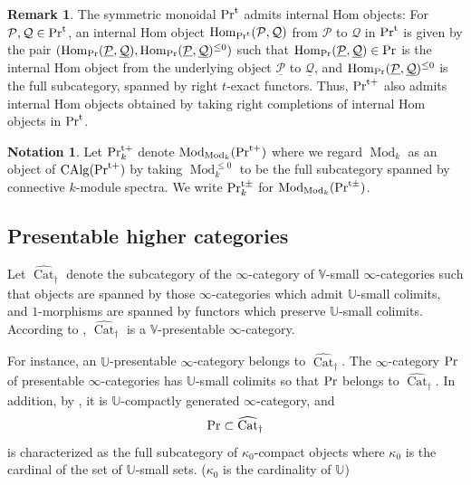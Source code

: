 \documentclass[leqno,12pt]{amsart}
\theoremstyle{plain}
\theoremstyle{definition}
\newtheorem{Remark}[Theorem]{Remark}
\newtheorem{Notation}[Theorem]{Notation}
\newcommand{\PR}{\textup{Pr}}
\newcommand{\PRT}{\textup{Pr}^{\textup{t}}}
\newcommand{\PRTT}{\textup{Pr}^{\textup{t}+}}
\newcommand{\PRTTT}{\textup{Pr}^{\textup{t}\pm}}
\newcommand{\Hom}{\operatorname{Hom}}
\newcommand{\Mod}{\operatorname{Mod}}
\newcommand{\CAlg}{\operatorname{CAlg}}
\newcommand{\vCat}{\widehat{\operatorname{Cat}}_\dagger}
\newcommand{\UUUU}{\mathbb{U}}
\newcommand{\VVVV}{\mathbb{V}}
\begin{document}
\begin{Remark}
\label{inthomtstr}
The symmetric monoidal $\PRT$ admits internal Hom objects: For $\mathcal{P}, \mathcal{Q}\in \PRT$, an internal Hom object $\Hom_{\PRT}(\mathcal{P},\mathcal{Q})$ from $\mathcal{P}$ to $\mathcal{Q}$ in $\PRT$ is 
given  by the pair $(\Hom_{\PR}(\underline{\mathcal{P}},\underline{\mathcal{Q}}), \Hom_{\PR}(\underline{\mathcal{P}},\underline{\mathcal{Q}})^{\le0})$
such that $\Hom_{\PR}(\underline{\mathcal{P}},\underline{\mathcal{Q}})\in \PR$ 
is the internal Hom object from the underlying object $\underline{\mathcal{P}}$ to $\underline{\mathcal{Q}}$, and 
 $\Hom_{\PR}(\underline{\mathcal{P}},\underline{\mathcal{Q}})^{\le0}$ is the full subcategory, spanned by right $t$-exact functors.
Thus, $\PRTT$ also admits internal Hom objects obtained by taking right completions of internal Hom objects in $\PRT$.
\end{Remark}





\begin{Notation}
Let $\PRTT_k$ denote $\Mod_{\Mod_k}(\PRTT)$ where we regard $\Mod_k$ as an object of $\CAlg(\PRTT)$ by taking $\Mod_k^{\le0}$
to be the full subcategory spanned by connective $k$-module spectra. 
We write $\PRTTT_k$ for $\Mod_{\Mod_k}(\PRTTT)$.
\end{Notation}
















\subsection{Presentable higher categories}

\label{PHCsec}


Let $\vCat$ denote the subcategory of the $\infty$-category of $\mathbb{V}$-small $\infty$-categories 
such that objects are spanned by those $\infty$-categories which admit $\UUUU$-small colimits,
and $1$-morphisms are spanned by functors which preserve $\UUUU$-small colimits.
According to \cite[4.8.4.2]{HA}, $\vCat$ is a $\VVVV$-presentable $\infty$-category.

For instance, 
an $\mathbb{U}$-presentable $\infty$-category belongs to $\vCat$.
The $\infty$-category $\PR$ of presentable $\infty$-categories has $\UUUU$-small colimits
so that $\PR$ belongs to $\vCat$. 
In addition,
by \cite[Proposition 5.1.4]{Ste}, it is $\UUUU$-compactly generated $\infty$-category, and
\[
\PR\subset \vCat
\]
is characterized as the full subcategory of $\kappa_0$-compact objects
where $\kappa_0$ is the cardinal of the set of $\UUUU$-small sets.
($\kappa_0$ is the cardinality of $\UUUU$)
\end{document}
